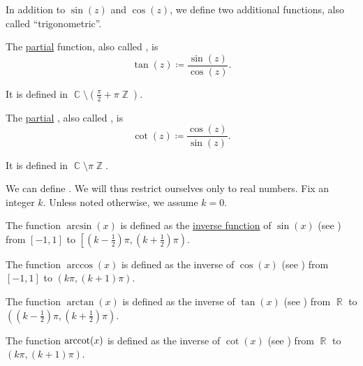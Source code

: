 \begin{definition}\label{def:derived_trigonometric_functions}
  In addition to \( \sin(z) \) and \( \cos(z) \), we define two additional functions, also called \enquote{trigonometric}.

  \begin{thmenum}
     The \hyperref[def:partial_function]{partial}  function, also called , is
    \begin{equation*}
      \tan(z) \coloneqq \frac {\sin(z)} {\cos(z)}.
    \end{equation*}

    It is defined in \( \BbbC \setminus (\tfrac \pi 2 + \pi\BbbZ) \).

     The \hyperref[def:partial_function]{partial} , also called , is
    \begin{equation*}
      \cot(z) \coloneqq \frac {\cos(z)} {\sin(z)}.
    \end{equation*}

    It is defined in \( \BbbC \setminus \pi\BbbZ \).
  \end{thmenum}
\end{definition}

\begin{definition}\label{def:inverse_trigonometric_functions}
  We can define . We will thus restrict ourselves only to real numbers. Fix an integer \( k \). Unless noted otherwise, we assume \( k = 0 \).

  \begin{thmenum}
     The  function \( \arcsin(x) \) is defined as the \hyperref[def:multi_valued_function/inverse]{inverse function} of \( \sin(x) \) (see ) from \( [-1, 1] \) to \( \left[(k - \tfrac 1 2) \pi, (k + \tfrac 1 2) \pi \right) \).

     The  function \( \arccos(x) \) is defined as the inverse of \( \cos(x) \) (see ) from \( [-1, 1] \) to \( (k\pi, (k + 1)\pi) \).

     The  function \( \arctan(x) \) is defined as the inverse of \( \tan(x) \) (see ) from \( \BbbR \) to \( \left((k - \tfrac 1 2) \pi, (k + \tfrac 1 2) \pi \right) \).

     The  function \( \operatorname{arccot}(x) \) is defined as the inverse of \( \cot(x) \) (see ) from \( \BbbR \) to \( (k\pi, (k + 1)\pi) \).
  \end{thmenum}
\end{definition}

